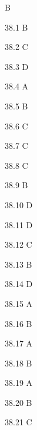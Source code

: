 \begin{Solution}{38}
B
\end{Solution}
\begin{Solution}{38.{1}}
B
\end{Solution}
\begin{Solution}{38.{2}}
C
\end{Solution}
\begin{Solution}{38.{3}}
D
\end{Solution}
\begin{Solution}{38.{4}}
A
\end{Solution}
\begin{Solution}{38.{5}}
B
\end{Solution}
\begin{Solution}{38.{6}}
C
\end{Solution}
\begin{Solution}{38.{7}}
C
\end{Solution}
\begin{Solution}{38.{8}}
C
\end{Solution}
\begin{Solution}{38.{9}}
B
\end{Solution}
\begin{Solution}{38.{10}}
D
\end{Solution}
\begin{Solution}{38.{11}}
D
\end{Solution}
\begin{Solution}{38.{12}}
C
\end{Solution}
\begin{Solution}{38.{13}}
B
\end{Solution}
\begin{Solution}{38.{14}}
D
\end{Solution}
\begin{Solution}{38.{15}}
A
\end{Solution}
\begin{Solution}{38.{16}}
B
\end{Solution}
\begin{Solution}{38.{17}}
A
\end{Solution}
\begin{Solution}{38.{18}}
B
\end{Solution}
\begin{Solution}{38.{19}}
A
\end{Solution}
\begin{Solution}{38.{20}}
B
\end{Solution}
\begin{Solution}{38.{21}}
C
\end{Solution}
